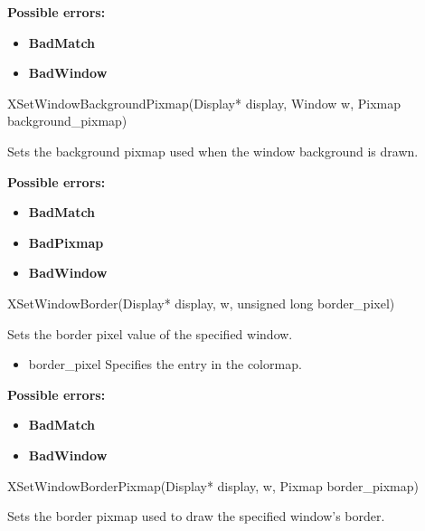 \documentclass{report}
\begin{document}
\begin{itemize}
            \bigbreak \noindent
            \textbf{Possible errors:}
            \begin{itemize}
                \item \textbf{BadMatch}
                \item \textbf{BadWindow}
            \end{itemize}

            \begin{cppcode}
                XSetWindowBackgroundPixmap(Display* display, Window w, Pixmap background_pixmap)
            \end{cppcode}
            \bigbreak \noindent
            Sets the background pixmap used when the window background is drawn.

            \bigbreak \noindent
            \textbf{Possible errors:}
            \begin{itemize}
                \item \textbf{BadMatch}
                \item \textbf{BadPixmap}
                \item \textbf{BadWindow}
            \end{itemize}

            \begin{cppcode}
                XSetWindowBorder(Display* display, w, unsigned long border_pixel)
            \end{cppcode}
            \bigbreak \noindent
            Sets the border pixel value of the specified window.

            \begin{itemize}
                \item border\_pixel Specifies the entry in the colormap.
            \end{itemize}

            \bigbreak \noindent
            \textbf{Possible errors:}
            \begin{itemize}
                \item \textbf{BadMatch}
                \item \textbf{BadWindow}
            \end{itemize}

            \begin{cppcode}
                XSetWindowBorderPixmap(Display* display, w, Pixmap border_pixmap)
            \end{cppcode}
            \bigbreak \noindent
            Sets the border pixmap used to draw the specified window's border.


\end{itemize}
\end{document}
